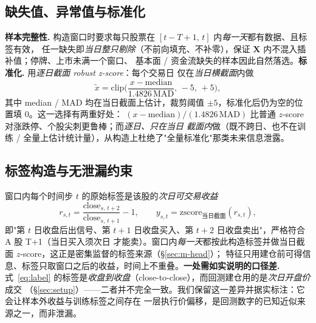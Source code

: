 \documentclass[a4paper,11pt,fontset=fandol]{ctexart}
\begin{document}
\subsection{缺失值、异常值与标准化}\label{sec:data-norm}
\textbf{\heiti 样本完整性.} 构造窗口时要求每只股票在 $[t{-}T{+}1,\,t]$ 内\emph{每一天}都有数据、且标签有效，
任一缺失即\emph{当日整只剔除}（不前向填充、不补零），保证 $\bm{X}$ 内不混入插补值；停牌、上市未满一个窗口、
基本面 / 资金流缺失的样本因此自然落选。\textbf{\heiti 标准化.} 用\emph{逐日截面 robust z-score}：每个交易日
仅在\emph{当日横截面}内做
\begin{equation}\label{eq:zscore}
\tilde{x} = \mathrm{clip}\!\Big(\frac{x-\mathrm{median}}{1.4826\,\mathrm{MAD}},\,-5,\,+5\Big),
\end{equation}
其中 median / MAD 均在当日截面上估计，裁剪阈值 $\pm5$，标准化后仍为空的位置填 $0$。这一选择有两重好处：
$(x-\mathrm{median})/(1.4826\,\mathrm{MAD})$ 比普通 $z$-score 对涨跌停、个股尖刺更鲁棒；而\emph{逐日、只在当日
截面内}做（既不跨日、也不在训练 / 全量上估计统计量），从构造上杜绝了"全量标准化"那类未来信息泄露。

\subsection{标签构造与无泄漏约束}\label{sec:data-label}
窗口内每个时间步 $t$ 的原始标签是该股的\emph{次日可交易收益}
\begin{equation}\label{eq:label}
r_{s,t} = \frac{\mathrm{close}_{s,\,t+2}}{\mathrm{close}_{s,\,t+1}} - 1,
\qquad y_{s,t}=\mathrm{zscore}_{\text{当日截面}}(r_{s,t}),
\end{equation}
即"第 $t$ 日收盘后出信号、第 $t{+}1$ 日收盘买入、第 $t{+}2$ 日收盘卖出"，严格符合 A 股 T+1（当日买入须次日
才能卖）。窗口内\emph{每一天}都按此构造标签并做当日截面 $z$-score，这正是密集监督的标签来源（§\ref{sec:m-head}）；
特征只用建仓前可得信息、标签只取窗口之后的收益，时间上不重叠。\textbf{\heiti 一处需如实说明的口径差.}
式~\eqref{eq:label} 的标签是\emph{收盘到收盘}（close-to-close），而回测建仓用的是\emph{次日开盘价}成交
（§\ref{sec:setup}）——二者并不完全一致。我们保留这一差异并据实标注：它会让样本外收益与训练标签之间存在
一层执行价偏移，是回测数字的已知近似来源之一，而非泄漏。
\end{document}
